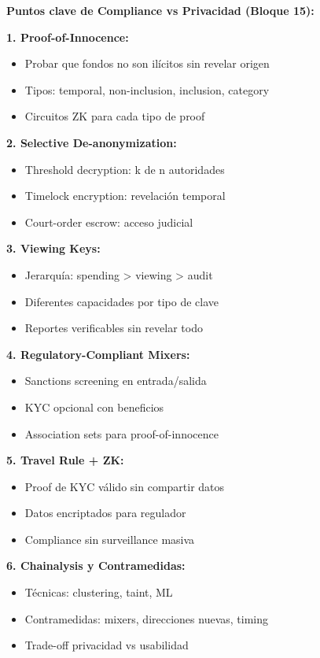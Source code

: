 \documentclass[11pt,a4paper,twoside]{book}
\theoremstyle{definition}
\theoremstyle{remark}
\begin{document}
\begin{keyidea}
\textbf{Puntos clave de Compliance vs Privacidad (Bloque 15):}

\textbf{1. Proof-of-Innocence:}
\begin{itemize}
    \item Probar que fondos no son ilícitos sin revelar origen
    \item Tipos: temporal, non-inclusion, inclusion, category
    \item Circuitos ZK para cada tipo de proof
\end{itemize}

\textbf{2. Selective De-anonymization:}
\begin{itemize}
    \item Threshold decryption: k de n autoridades
    \item Timelock encryption: revelación temporal
    \item Court-order escrow: acceso judicial
\end{itemize}

\textbf{3. Viewing Keys:}
\begin{itemize}
    \item Jerarquía: spending > viewing > audit
    \item Diferentes capacidades por tipo de clave
    \item Reportes verificables sin revelar todo
\end{itemize}

\textbf{4. Regulatory-Compliant Mixers:}
\begin{itemize}
    \item Sanctions screening en entrada/salida
    \item KYC opcional con beneficios
    \item Association sets para proof-of-innocence
\end{itemize}

\textbf{5. Travel Rule + ZK:}
\begin{itemize}
    \item Proof de KYC válido sin compartir datos
    \item Datos encriptados para regulador
    \item Compliance sin surveillance masiva
\end{itemize}

\textbf{6. Chainalysis y Contramedidas:}
\begin{itemize}
    \item Técnicas: clustering, taint, ML
    \item Contramedidas: mixers, direcciones nuevas, timing
    \item Trade-off privacidad vs usabilidad
\end{itemize}


\end{keyidea}
\end{document}
